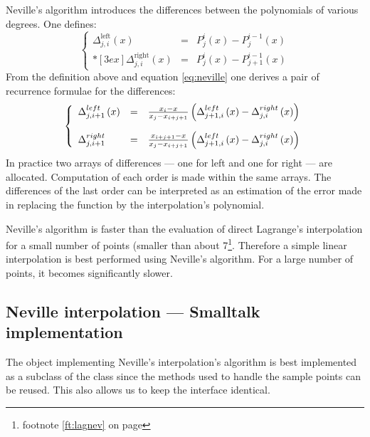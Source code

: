Neville's algorithm introduces the differences between the
polynomials of various degrees. One defines:
\begin{equation}
\left\{ \begin{array}{lcl} \Delta_{j,i}^{\mathop
{left}}\left(x\right)
&=&P^i_j\left(x\right)-P^{i-1}_j\left(x\right)
\\*[3 ex] \Delta_{j,i}^{\mathop{right}}\left(x\right) &=&P^i_j\left(x\right)-P^{i-1}_{j+1}\left(x\right)
\end{array}\right.
\end{equation}
From the definition above and equation \ref{eq:neville} one
derives a pair of recurrence formulae for the differences:
\begin{equation}
\left\{ \begin{array}{lcl}\Delta_{j,i+1}^{\mathop
{left}}\left(x\right) &=&{x_i-x\over
x_j-x_{i+j+1}}\left(\Delta_{j+1,i}^{\mathop
{left}}\left(x\right)-\Delta_{j,i}^{\mathop
{right}}\left(x\right)\right)
\\*[3 ex] \Delta_{j,i+1}^{\mathop{right}} &=&{x_{i+j+1}-x\over
x_j-x_{i+j+1}}\left(\Delta_{j+1,i}^{\mathop
{left}}\left(x\right)-\Delta_{j,i}^{\mathop
{right}}\left(x\right)\right)
\end{array}\right.
\end{equation}
In practice two arrays of differences --- one for left and one for
right --- are allocated. Computation of each order is made within
the same arrays. The differences of the last order can be
interpreted as an estimation of the error made in replacing the
function by the interpolation's polynomial.

Neville's algorithm is faster than the evaluation of direct
Lagrange's interpolation for a small number of points (smaller
than about 7\footnote{\cf footnote \ref{ft:lagnev} on page
\pageref{ft:lagnev}}. Therefore a simple linear interpolation is
best performed using Neville's algorithm. For a large number of
points, it becomes significantly slower.

\subsection{ Neville interpolation --- Smalltalk  implementation}
 The object implementing Neville's
interpolation's algorithm is best implemented as a subclass of the
class  since the methods used to handle
the sample points can be reused. This also allows us to keep the
interface identical.

